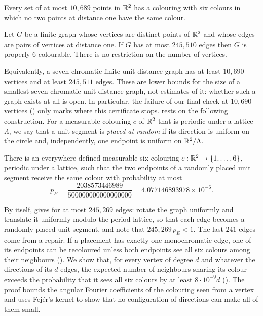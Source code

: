 \documentclass[11pt,colorlinks]{charlie}
\begin{document}
\begin{theorem}\label{thm:points}
Every set of at most $10{,}689$ points in $\mathbb{R}^2$ has a colouring with six colours in which no two points at distance one have the same colour.
\end{theorem}

\begin{theorem}\label{thm:edges}
Let $G$ be a finite graph whose vertices are distinct points of $\mathbb{R}^2$ and whose edges are pairs of vertices at distance one. If $G$ has at most $245{,}510$ edges then $G$ is properly $6$-colourable. There is no restriction on the number of vertices.
\end{theorem}

Equivalently, a seven-chromatic finite unit-distance graph has at least $10{,}690$ vertices and at least $245{,}511$ edges. These are lower bounds for the size of a smallest seven-chromatic unit-distance graph, not estimates of it: whether such a graph exists at all is open. In particular, the failure of our final check at $10{,}690$ vertices () only marks where this certificate stops.  rests on the following construction. For a measurable colouring $c$ of $\mathbb{R}^2$ that is periodic under a lattice $\Lambda$, we say that a unit segment is \emph{placed at random} if its direction is uniform on the circle and, independently, one endpoint is uniform on $\mathbb{R}^2/\Lambda$.

\begin{theorem}\label{thm:wave}
There is an everywhere-defined measurable six-colouring $c:\mathbb{R}^2\to\{1,\dots,6\}$, periodic under a lattice, such that the two endpoints of a randomly placed unit segment receive the same colour with probability at most
\[
 p_E=\frac{2038573446989}{500000000000000000}=4.077146893978\times10^{-6}.
\]
\end{theorem}

By itself,  gives  for at most $245{,}269$ edges: rotate the graph uniformly and translate it uniformly modulo the period lattice, so that each edge becomes a randomly placed unit segment, and note that $245{,}269\,p_E<1$. The last $241$ edges come from a repair. If a placement has exactly one monochromatic edge, one of its endpoints can be recoloured unless both endpoints see all six colours among their neighbours (). We show that, for every vertex of degree $d$ and whatever the directions of its $d$ edges, the expected number of neighbours sharing its colour exceeds the probability that it sees all six colours by at least $8\cdot10^{-9}d$ (). The proof bounds the angular Fourier coefficients of the colouring seen from a vertex and uses Fej\'er's kernel to show that no configuration of directions can make all of them small.
\end{document}
